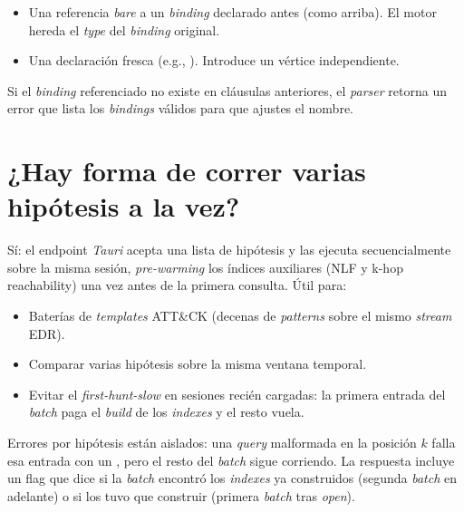 \begin{itemize}
    \item Una referencia \emph{bare} a un \emph{binding} declarado
    antes (como  arriba). El motor hereda el \emph{type} del
    \emph{binding} original.
    \item Una declaración fresca  (e.g.,
    ). Introduce un vértice
    independiente.
\end{itemize}

Si el \emph{binding} referenciado no existe en cláusulas anteriores,
el \emph{parser} retorna un error que lista los \emph{bindings}
válidos para que ajustes el nombre.

\section{¿Hay forma de correr varias hipótesis a la vez?}

Sí: el endpoint \emph{Tauri}  acepta una
lista de hipótesis y las ejecuta secuencialmente sobre la misma
sesión, \emph{pre-warming} los índices auxiliares (NLF y k-hop
reachability) una vez antes de la primera consulta. Útil para:

\begin{itemize}
    \item Baterías de \emph{templates} ATT\&CK (decenas de
    \emph{patterns} sobre el mismo \emph{stream} EDR).
    \item Comparar varias hipótesis sobre la misma ventana
    temporal.
    \item Evitar el \emph{first-hunt-slow} en sesiones recién
    cargadas: la primera entrada del \emph{batch} paga el
    \emph{build} de los \emph{indexes} y el resto vuela.
\end{itemize}

Errores por hipótesis están aislados: una \emph{query} malformada
en la posición $k$ falla esa entrada con un , pero el
resto del \emph{batch} sigue corriendo. La respuesta incluye un
flag  que dice si la \emph{batch} encontró
los \emph{indexes} ya construidos (segunda \emph{batch} en
adelante) o si los tuvo que construir (primera \emph{batch} tras
\emph{open}).
